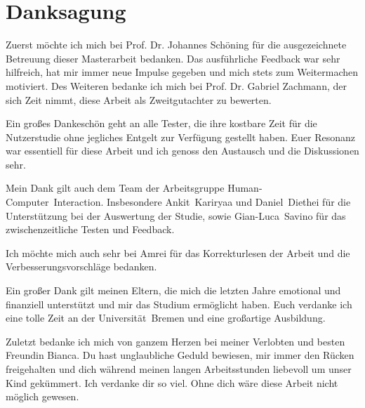 \chapter*{Danksagung}
\thispagestyle{empty}

Zuerst möchte ich mich bei Prof. Dr. Johannes Schöning für die ausgezeichnete Betreuung dieser Masterarbeit bedanken.
Das ausführliche Feedback war sehr hilfreich, hat mir immer neue Impulse gegeben und mich stets zum Weitermachen motiviert.
Des Weiteren bedanke ich mich bei Prof. Dr. Gabriel Zachmann, der sich Zeit nimmt, diese Arbeit als Zweitgutachter zu bewerten.

\noindent
Ein großes Dankeschön geht an alle Tester, die ihre kostbare Zeit für die Nutzerstudie ohne jegliches Entgelt zur Verfügung gestellt haben.
Euer Resonanz war essentiell für diese Arbeit und ich genoss den Austausch und die Diskussionen sehr.

\noindent
Mein Dank gilt auch dem Team der Arbeitsgruppe Human-Computer~Interaction.
Insbesondere Ankit~Kariryaa und Daniel~Diethei für die Unterstützung bei der Auswertung der Studie, sowie Gian-Luca~Savino für das zwischenzeitliche Testen und Feedback.

\noindent
Ich möchte mich auch sehr bei Amrei für das Korrekturlesen der Arbeit und die Verbesserungsvorschläge bedanken.

\noindent
Ein großer Dank gilt meinen Eltern, die mich die letzten Jahre emotional und finanziell unterstützt und mir das Studium ermöglicht haben.
Euch verdanke ich eine tolle Zeit an der Universität~Bremen und eine großartige Ausbildung.

\noindent
Zuletzt bedanke ich mich von ganzem Herzen bei meiner Verlobten und besten Freundin Bianca.
Du hast unglaubliche Geduld bewiesen, mir immer den Rücken freigehalten und dich während meinen langen Arbeitsstunden liebevoll um unser Kind gekümmert.
Ich verdanke dir so viel. Ohne dich wäre diese Arbeit nicht möglich gewesen.

\cleardoublepage
